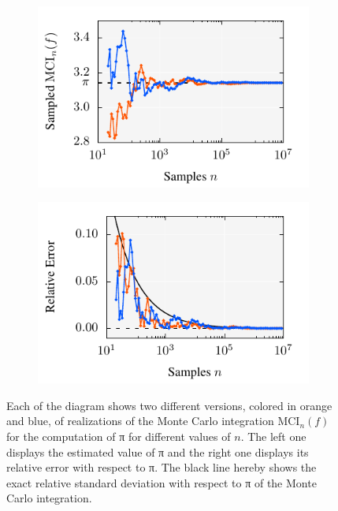\documentclass{stdlocal}
\begin{document}
    \begin{figure}
      \center
      \begin{subfigure}[b]{0.49\linewidth}
        \center
        \includegraphics[width=\linewidth]{examples/monte_carlo_pi_plot.pdf}
      \end{subfigure}
      \begin{subfigure}[b]{0.49\linewidth}
        \center
        \includegraphics[width=\linewidth]{examples/monte_carlo_pi_plot_error.pdf}
      \end{subfigure}
      \caption[Monte Carlo Integration Plots for the Computation of π]{%
        Each of the diagram shows two different versions, colored in orange and blue, of realizations of the Monte Carlo integration $\mathrm{MCI}_n(f)$ for the computation of π for different values of $n$.
        The left one displays the estimated value of π and the right one displays its relative error with respect to π.
        The black line hereby shows the exact relative standard deviation with respect to π of the Monte Carlo integration.
      }
      \label{fig:pi-computation-plots}
    \end{figure}
\end{document}
